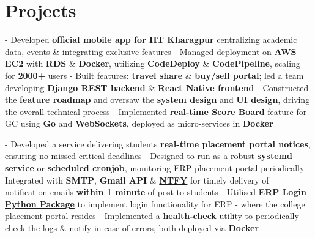 \documentclass[a4paper,10pt]{extarticle} %
\begin{document}
\section{\textcolor{primary}{Projects}}
 \vspace{0.1cm}
\begin{description}[style=nextline, font=$\bullet$\hspace{2mm}\normalsize]

 \item[{\href{https://play.google.com/store/apps/details?id=com.apnainsti&pli=1}{ApnaInsti}} | Golang, AWS, Docker, Nginx ] 
- Developed \textbf{official mobile app for IIT Kharagpur} centralizing academic data, events \& integrating exclusive features \newline
- Managed deployment on \textbf{AWS EC2} with \textbf{RDS} \& \textbf{Docker}, utilizing \textbf{CodeDeploy} \& \textbf{CodePipeline}, scaling for \textbf{2000+} users \newline
- Built features: \textbf{travel share} \& \textbf{buy/sell portal}; led a team developing \textbf{Django REST backend} \& \textbf{React Native frontend} \newline
- Constructed the \textbf{feature roadmap} and oversaw the \textbf{system design} and \textbf{UI design}, driving the overall technical process \newline
- Implemented \textbf{real-time Score Board} feature for GC using \textbf{Go} and \textbf{WebSockets}, deployed as micro-services in \textbf{Docker}

 \item[{\href{http://github.com/metakgp/mftp}{MFTP}} | Python, Docker, Gmail API, ERP Login Module, Systemd, Cronjob ]
- Developed a service delivering students \textbf{ real-time placement portal notices}, ensuring no missed critical deadlines \newline
- Designed to run as a robust \textbf{systemd service} or \textbf{scheduled cronjob}, monitoring ERP placement portal periodically \newline
- Integrated with \textbf{SMTP}, \textbf{Gmail API} \& \href{https://ntfy.sh}{\textbf{NTFY}} for timely delivery of notification emails \textbf{within 1 minute} of post to students \newline
- Utilised \href{https://github.com/proffapt/iitkgp-erp-login-pypi}{\textbf{ERP Login Python Package}} to implement login functionality for ERP - where the college placement portal resides \newline
- Implemented a \textbf{health-check} utility to periodically check the logs \& notify in case of errors, both deployed via \textbf{Docker}


\end{description}
\end{document}
